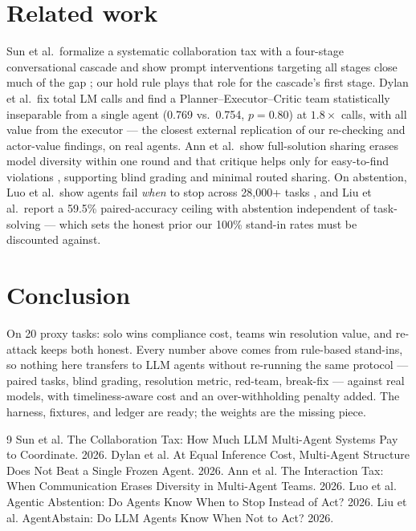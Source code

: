 \documentclass[11pt]{article}
\begin{document}
\section{Related work}
Sun et al.\ formalize a systematic collaboration tax with a four-stage
conversational cascade and show prompt interventions targeting all stages
close much of the gap \citep{sun2026tax}; our hold rule plays that role for
the cascade's first stage. Dylan et al.\ fix total LM calls and find a
Planner--Executor--Critic team statistically inseparable from a single agent
(0.769 vs.\ 0.754, $p=0.80$) at $1.8\times$ calls, with all value from the
executor \citep{dylan2026equal} --- the closest external replication of our
re-checking and actor-value findings, on real agents. Ann et al.\ show
full-solution sharing erases model diversity within one round and that
critique helps only for easy-to-find violations \citep{ann2026interaction},
supporting blind grading and minimal routed sharing. On abstention, Luo et
al.\ show agents fail \emph{when} to stop across 28,000+ tasks
\citep{luo2026agentic}, and Liu et al.\ report a 59.5\% paired-accuracy
ceiling with abstention independent of task-solving \citep{liu2026agentabstain}
--- which sets the honest prior our 100\% stand-in rates must be discounted
against.

\section{Conclusion}
On 20 proxy tasks: solo wins compliance cost, teams win resolution value, and
re-attack keeps both honest. Every number above comes from rule-based
stand-ins, so nothing here transfers to LLM agents without re-running the
same protocol --- paired tasks, blind grading, resolution metric, red-team,
break-fix --- against real models, with timeliness-aware cost and an
over-withholding penalty added. The harness, fixtures, and ledger are ready;
the weights are the missing piece.

\begin{thebibliography}{9}
 Sun et al. The Collaboration Tax: How
  Much LLM Multi-Agent Systems Pay to Coordinate. 2026.
 Dylan et al. At Equal Inference
  Cost, Multi-Agent Structure Does Not Beat a Single Frozen Agent. 2026.
 Ann et al. The Interaction Tax:
  When Communication Erases Diversity in Multi-Agent Teams. 2026.
 Luo et al. Agentic Abstention: Do
  Agents Know When to Stop Instead of Act? 2026.
 Liu et al. AgentAbstain: Do
  LLM Agents Know When Not to Act? 2026.
\end{thebibliography}
\end{document}
